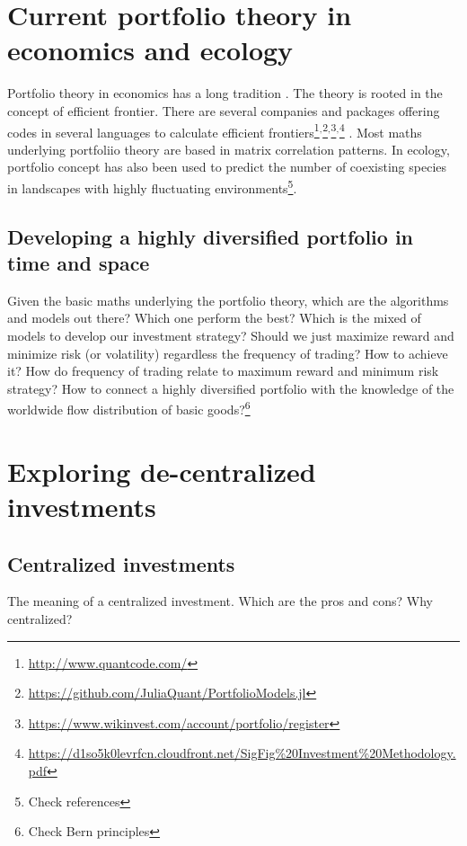 \documentclass[english,12pt]{article}
\begin{document}
\section{Current portfolio theory in economics and ecology}

Portfolio theory in economics has a long tradition
\citep{MarkowitzBook}. The theory is rooted in the concept of efficient frontier. There are several companies and packages offering codes in several languages to calculate efficient frontiers\footnote{\url{http://www.quantcode.com/}}$^{,}$\footnote{\url{https://github.com/JuliaQuant/PortfolioModels.jl}}$^{,}$\footnote{\url{https://www.wikinvest.com/account/portfolio/register}}$^{,}$\footnote{\url{https://d1so5k0levrfcn.cloudfront.net/SigFig\%20Investment\%20Methodology.pdf}} . Most maths underlying portfoliio theory are based in matrix correlation patterns. In ecology, portfolio concept has also been used to predict the number of coexisting species in landscapes with highly fluctuating environments\footnote{Check references}.

\subsection{Developing a highly diversified portfolio in time and space}

Given the basic maths underlying the portfolio theory, which are the
algorithms and models out there? Which one perform the best? Which is
the mixed of models to develop our investment strategy? Should we just
maximize reward and minimize risk (or volatility) regardless
the frequency of trading? How to achieve it? How do frequency of
trading relate to maximum reward and minimum risk strategy? How to
connect a highly diversified portfolio with the knowledge of the
worldwide flow distribution of basic goods?\footnote{Check Bern
  principles}

\newpage
\section{Exploring de-centralized investments}

\subsection{Centralized investments}

The meaning of a centralized investment. Which are the pros and cons? Why centralized?
\end{document}
